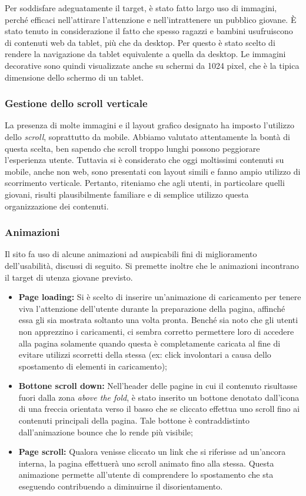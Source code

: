 \documentclass[12pt]{article}
\begin{document}
		Per soddisfare adeguatamente il target, è stato fatto largo uso di immagini, perché efficaci nell'attirare l'attenzione e nell'intrattenere un pubblico giovane. È stato tenuto in considerazione il fatto che spesso ragazzi e bambini usufruiscono di contenuti web da tablet, più che da desktop. Per questo è stato scelto di rendere la navigazione da tablet equivalente a quella da desktop. Le immagini decorative sono quindi visualizzate anche su schermi da 1024 pixel, che è la tipica dimensione dello schermo di un tablet.
	
		\subsubsection{Gestione dello scroll verticale}
		La presenza di molte immagini e il layout grafico designato ha imposto l'utilizzo dello \textit{scroll}, soprattutto da mobile. Abbiamo valutato attentamente la bontà di questa scelta, ben sapendo che scroll troppo lunghi possono peggiorare l'esperienza utente. Tuttavia si è considerato che oggi moltissimi contenuti su mobile, anche non web, sono presentati con layout simili e fanno ampio utilizzo di scorrimento verticale. Pertanto, riteniamo che agli utenti, in particolare quelli giovani, risulti plausibilmente familiare e di semplice utilizzo questa organizzazione dei contenuti.
		
		\subsubsection{Animazioni}
		Il sito fa uso di alcune animazioni ad auspicabili fini di miglioramento dell'usabilità,  discussi di seguito. Si premette inoltre che le animazioni incontrano il target di utenza giovane previsto.
		
		\begin{itemize}
			\item \textbf{Page loading:} Si è scelto di inserire un'animazione di caricamento per tenere viva l'attenzione dell'utente durante la preparazione della pagina, affinché essa gli sia mostrata soltanto una volta pronta. Benché sia noto che gli utenti non apprezzino i caricamenti, ci sembra corretto permettere loro di accedere alla pagina solamente quando questa è completamente caricata al fine di evitare utilizzi scorretti della stessa (ex: click involontari a causa dello spostamento di elementi in caricamento);
			\item \textbf{Bottone scroll down:} Nell'header delle pagine in cui il contenuto risultasse fuori dalla zona \textit{above the fold}, è stato inserito un bottone denotato dall'icona di una freccia orientata verso il basso che se cliccato effettua uno scroll fino ai contenuti principali della pagina. Tale bottone è contraddistinto dall'animazione bounce che lo rende più visibile;
			\item \textbf{Page scroll:} Qualora venisse cliccato un link che si riferisse ad un'ancora interna, la pagina effettuerà uno scroll animato fino alla stessa. Questa animazione permette all'utente di comprendere lo spostamento che sta eseguendo contribuendo a diminuirne il disorientamento. 
		\end{itemize}
\end{document}
